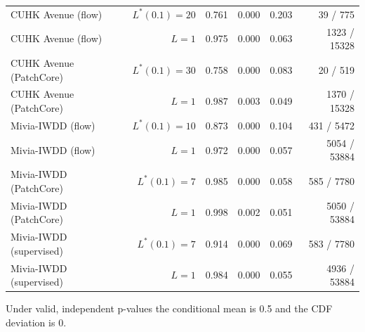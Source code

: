 \begin{table}[t]
{\begin{tabular}{lrrrrr}
CUHK Avenue (flow) & $L^\ast(0.1)=20$ & 0.761 & 0.000 & 0.203 & 39 / 775 \\
CUHK Avenue (flow) & $L=1$ & 0.975 & 0.000 & 0.063 & 1323 / 15328 \\
CUHK Avenue (PatchCore) & $L^\ast(0.1)=30$ & 0.758 & 0.000 & 0.083 & 20 / 519 \\
CUHK Avenue (PatchCore) & $L=1$ & 0.987 & 0.003 & 0.049 & 1370 / 15328 \\
Mivia-IWDD (flow) & $L^\ast(0.1)=10$ & 0.873 & 0.000 & 0.104 & 431 / 5472 \\
Mivia-IWDD (flow) & $L=1$ & 0.972 & 0.000 & 0.057 & 5054 / 53884 \\
Mivia-IWDD (PatchCore) & $L^\ast(0.1)=7$ & 0.985 & 0.000 & 0.058 & 585 / 7780 \\
Mivia-IWDD (PatchCore) & $L=1$ & 0.998 & 0.002 & 0.051 & 5050 / 53884 \\
Mivia-IWDD (supervised) & $L^\ast(0.1)=7$ & 0.914 & 0.000 & 0.069 & 583 / 7780 \\
Mivia-IWDD (supervised) & $L=1$ & 0.984 & 0.000 & 0.055 & 4936 / 53884 \\
\bottomrule
\end{tabular}}
\begin{minipage}{\linewidth}\vspace{2pt}\footnotesize Under valid, independent p-values the conditional mean is 0.5 and the CDF deviation is 0.\end{minipage}
\end{table}
